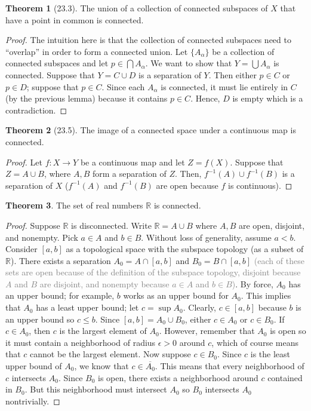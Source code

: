 \documentclass{article}
\newcommand{\com}[1]{\textcolor{grey}{#1}}
\theoremstyle{definition}
\newtheorem{theorem}{Theorem}[subsection]
\begin{document}
\begin{flushleft}
\begin{theorem}[23.3]
The union of a collection of connected subspaces of $X$ that have a point in common is connected.
\end{theorem}

\begin{proof}
The intuition here is that the collection of connected subspaces need to ``overlap'' in order to form a connected union. Let $\{A_\alpha\}$ be a collection of connected subspaces and let $p \in \bigcap A_\alpha$. We want to show that $Y = \bigcup A_\alpha$ is connected. Suppose that $Y = C \cup D$ is a separation of $Y$. Then either $p \in C$ or $p \in D$; suppose that $p \in C$. Since each $A_\alpha$ is connected, it must lie entirely in $C$ (by the previous lemma) because it contains $p \in C$. Hence, $D$ is empty which is a contradiction.
\end{proof}

\begin{theorem}[23.5]
The image of a connected space under a continuous map is connected.
\end{theorem}

\begin{proof}
Let $f : X \to Y$ be a continuous map and let $Z = f(X)$. Suppose that $Z = A \cup B$, where $A,B$ form a separation of $Z$. Then, $f^{-1}(A) \cup f^{-1}(B)$ is a separation of $X$ ($f^{-1}(A)$ and $f^{-1}(B)$ are open because $f$ is continuous).
\end{proof}

\begin{theorem}
The set of real numbers $\mathbb{R}$ is connected.
\end{theorem}

\begin{proof}
Suppose $\mathbb{R}$ is disconnected. Write $\mathbb{R} = A \cup B$ where $A,B$ are open, disjoint, and nonempty. Pick $a \in A$ and $b \in B$. Without loss of generality, assume $a < b$. Consider $[a,b]$ as a topological space with the subspace topology (as a subset of $\mathbb{R}$). There exists a separation $A_0 = A \cap [a,b]$ and $B_0 = B \cap [a,b]$ \com{(each of these sets are open because of the definition of the subspace topology, disjoint because $A$ and $B$ are disjoint, and nonempty because $a \in A$ and $b \in B$)}. By force, $A_0$ has an upper bound; for example, $b$ works as an upper bound for $A_0$. This implies that $A_0$ has a least upper bound; let $c = \sup A_0$. Clearly, $c \in [a,b]$ because $b$ is an upper bound so $c \leq b$. Since $[a,b] = A_0 \cup B_0$, either $c \in A_0$ or $c \in B_0$. If $c \in A_0$, then $c$ is the largest element of $A_0$. However, remember that $A_0$ is open so it must contain a neighborhood of radius $\epsilon > 0$ around $c$, which of course means that $c$ cannot be the largest element. Now suppose $c \in B_0$. Since $c$ is the least upper bound of $A_0$, we know that $c \in \overline{A_0}$. This means that every neighborhood of $c$ intersects $A_0$. Since $B_0$ is open, there exists a neighborhood around $c$ contained in $B_0$. But this neighborhood must intersect $A_0$ so $B_0$ intersects $A_0$ nontrivially.
\end{proof}


\end{flushleft}
\end{document}
